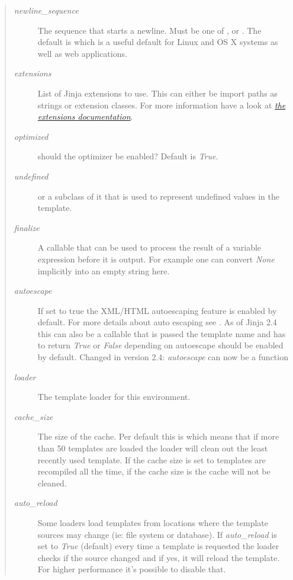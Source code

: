 \documentclass[a4paper,10pt,english]{sphinxmanual}
\begin{document}
\begin{fulllineitems}
\begin{quote}
\begin{description}
\item[{\emph{newline\_sequence}}] \leavevmode
The sequence that starts a newline.  Must be one of ,
 or .  The default is  which is a
useful default for Linux and OS X systems as well as web
applications.

\item[{\emph{extensions}}] \leavevmode
List of Jinja extensions to use.  This can either be import paths
as strings or extension classes.  For more information have a
look at {\hyperref[extensions:jinja-extensions]{\emph{the extensions documentation}}}.

\item[{\emph{optimized}}] \leavevmode
should the optimizer be enabled?  Default is \emph{True}.

\item[{\emph{undefined}}] \leavevmode
{\hyperref[api:jinja2.Undefined]{}} or a subclass of it that is used to represent
undefined values in the template.

\item[{\emph{finalize}}] \leavevmode
A callable that can be used to process the result of a variable
expression before it is output.  For example one can convert
\emph{None} implicitly into an empty string here.

\item[{\emph{autoescape}}] \leavevmode
If set to true the XML/HTML autoescaping feature is enabled by
default.  For more details about auto escaping see
.  As of Jinja 2.4 this can also
be a callable that is passed the template name and has to
return \emph{True} or \emph{False} depending on autoescape should be
enabled by default.
Changed in version 2.4: \emph{autoescape} can now be a function
\item[{\emph{loader}}] \leavevmode
The template loader for this environment.

\item[{\emph{cache\_size}}] \leavevmode
The size of the cache.  Per default this is  which means
that if more than 50 templates are loaded the loader will clean
out the least recently used template.  If the cache size is set to
 templates are recompiled all the time, if the cache size is
 the cache will not be cleaned.

\item[{\emph{auto\_reload}}] \leavevmode
Some loaders load templates from locations where the template
sources may change (ie: file system or database).  If
\emph{auto\_reload} is set to \emph{True} (default) every time a template is
requested the loader checks if the source changed and if yes, it
will reload the template.  For higher performance it's possible to
disable that.


\end{description}
\end{quote}
\end{fulllineitems}
\end{document}
